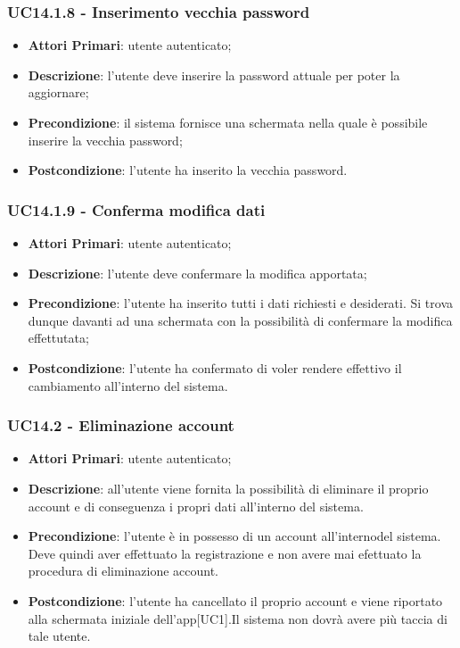 \subsubsection{UC14.1.8 - Inserimento vecchia password}
\begin{itemize}
	\item \textbf{Attori Primari}: utente autenticato;
	\item \textbf{Descrizione}: l'utente deve inserire la password attuale per poter la aggiornare;
	\item \textbf{Precondizione}: il sistema fornisce una schermata nella quale è possibile inserire la vecchia password;
	\item \textbf{Postcondizione}: l'utente ha inserito la vecchia password.
\end{itemize}

\subsubsection{UC14.1.9 - Conferma modifica dati}
\begin{itemize}
	\item \textbf{Attori Primari}: utente autenticato;
	\item \textbf{Descrizione}: l'utente deve 
	confermare la modifica apportata;
	\item \textbf{Precondizione}: l'utente ha inserito tutti i dati richiesti e desiderati. Si trova dunque davanti ad una schermata con la possibilità di confermare la modifica effettutata;
	\item \textbf{Postcondizione}: l'utente ha confermato di voler rendere effettivo il cambiamento all'interno del sistema.
\end{itemize}

\subsubsection{UC14.2 - Eliminazione account}
\begin{itemize}
	\item \textbf{Attori Primari}: utente autenticato;
	\item \textbf{Descrizione}: all'utente viene fornita la possibilità di eliminare il proprio account e di conseguenza i propri dati all'interno del sistema.
	\item \textbf{Precondizione}: l'utente è in possesso di un account all'internodel sistema. Deve quindi aver effettuato la registrazione e non avere mai efettuato la procedura di eliminazione account.
	\item \textbf{Postcondizione}: l'utente ha cancellato il proprio account e viene riportato alla schermata iniziale dell'app[UC1].Il sistema non dovrà avere più taccia di tale utente.
\end{itemize}




